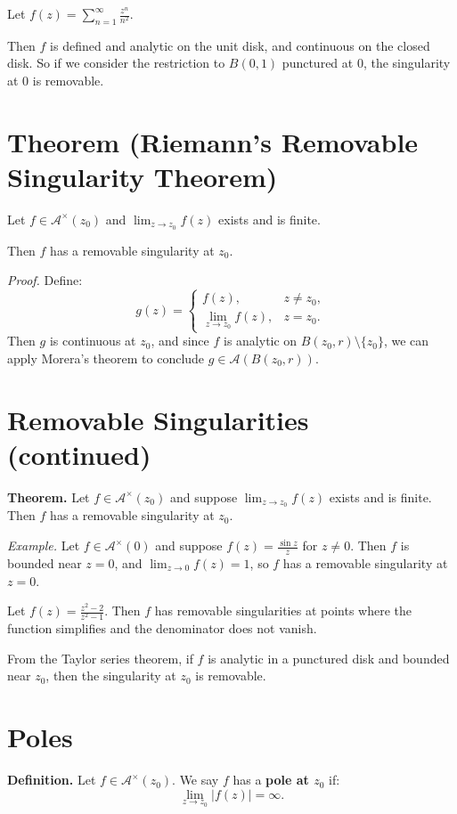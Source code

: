 \documentclass[12pt]{article}
\theoremstyle{definition} %
\theoremstyle{plain} %
\begin{document}
Let $f(z) = \sum_{n=1}^\infty \frac{z^n}{n^2}$.

Then $f$ is defined and analytic on the unit disk, and continuous on the closed disk. So if we consider the restriction to $B(0,1)$ punctured at $0$, the singularity at $0$ is removable.

\section*{Theorem (Riemann's Removable Singularity Theorem)}

Let $f \in \mathcal{A}^\times(z_0)$ and $\lim_{z \to z_0} f(z)$ exists and is finite.

Then $f$ has a removable singularity at $z_0$.

\textit{Proof.} Define:
\[
g(z) = 
\begin{cases}
f(z), & z \neq z_0, \\
\lim_{z \to z_0} f(z), & z = z_0.
\end{cases}
\]
Then $g$ is continuous at $z_0$, and since $f$ is analytic on $B(z_0, r) \setminus \{z_0\}$, we can apply Morera's theorem to conclude $g \in \mathcal{A}(B(z_0, r))$.
\section*{Removable Singularities (continued)}

\textbf{Theorem.} Let $f \in \mathcal{A}^\times(z_0)$ and suppose $\lim_{z \to z_0} f(z)$ exists and is finite. Then $f$ has a removable singularity at $z_0$.

\textit{Example.} Let $f \in \mathcal{A}^\times(0)$ and suppose $f(z) = \frac{\sin z}{z}$ for $z \neq 0$. Then $f$ is bounded near $z = 0$, and $\lim_{z \to 0} f(z) = 1$, so $f$ has a removable singularity at $z = 0$.

Let $f(z) = \frac{z^2 - 2}{z^2 - 1}$. Then $f$ has removable singularities at points where the function simplifies and the denominator does not vanish.

From the Taylor series theorem, if $f$ is analytic in a punctured disk and bounded near $z_0$, then the singularity at $z_0$ is removable.

\section*{Poles}

\textbf{Definition.} Let $f \in \mathcal{A}^\times(z_0)$. We say $f$ has a \textbf{pole at $z_0$} if:
\[
\lim_{z \to z_0} |f(z)| = \infty.
\]
\end{document}
